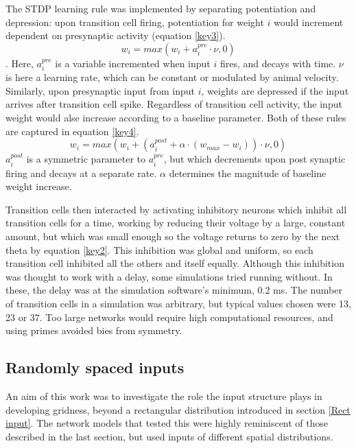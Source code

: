 \documentclass{article}
\begin{document}
    The STDP learning rule was implemented by separating potentiation and depression: upon transition cell firing, potentiation for weight \(i\) would increment dependent on presynaptic activity (equation \ref{key3}).  
    \begin{equation} \label{key3} w_i = max(w_i + a^{pre}_i \cdot \nu, 0)\end{equation}. 
    Here, \(a^{pre}_i\) is a variable incremented when input \(i\) fires, and decays with time. \(\nu\) is here a learning rate, which can be constant or modulated by animal velocity.
    Similarly, upon presynaptic input from input \(i\), weights are depressed if the input arrives after transition cell spike. Regardless of transition cell activity, the input weight would alse increase according to a baseline parameter. Both of these rules are captured in equation \ref{key4}. 
    \begin{equation} \label{key4} w_i = max(w_i + (a^{post}_i + \alpha \cdot (w_{max}-w_i)) \cdot \nu, 0)\end{equation} 
    \(a^{post}_i\) is a symmetric parameter to \(a^{pre}_i\), but which decrements upon post synaptic firing and decays at a separate rate. \(\alpha\) determines the magnitude of baseline weight increase.

    Transition cells then interacted by activating inhibitory neurons which inhibit all transition cells for a time, working by reducing their voltage by a large, constant amount, but which was small enough so the voltage returns to zero by the next theta by equation \ref{key2}. This inhibition was global and uniform, so each transition cell inhibited all the others and itself equally. Although this inhibition was thought to work with a delay, some simulations tried running without. In these, the delay was at the simulation software's minimum, 0.2 ms. The number of transition cells in a simulation was arbitrary, but typical values chosen were 13, 23 or 37. Too large networks would require high computational resources, and using primes avoided bies from symmetry.

    \subsection{Randomly spaced inputs} \label{Rand input}
    An aim of this work was to investigate the role the input structure plays in developing gridness, beyond a rectangular distribution introduced in section \ref{Rect input}. The network models that tested this were highly reminiscent of those described in the last section, but used inputs of different spatial distributions.
    
\end{document}
